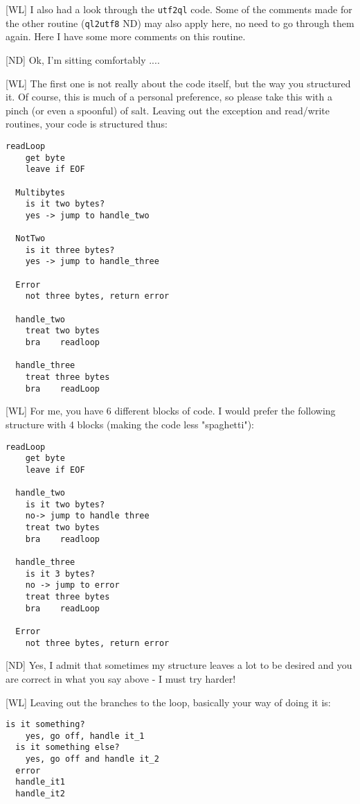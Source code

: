 [WL] I also had a look through the \texttt{utf2ql} code. Some of the comments made for the other routine (\texttt{ql2utf8} ND) may also apply here, no need to go through them again. Here I have some more comments on this routine.

[ND] Ok, I'm sitting comfortably ....
	
[WL] The first one is not really about the code itself, but the way you structured it. Of course, this is much of a personal preference, so please take this with a pinch (or even a spoonful) of salt. Leaving out the exception and read/write routines, your code is structured thus:
	
\begin{lstlisting}[numbers=none]
  readLoop
    get byte
    leave if EOF

  Multibytes
    is it two bytes?
    yes -> jump to handle_two
  
  NotTwo
    is it three bytes?
    yes -> jump to handle_three

  Error   
    not three bytes, return error

  handle_two   
    treat two bytes
    bra    readloop

  handle_three
    treat three bytes
    bra    readLoop
\end{lstlisting}
	
	
[WL] For me, you have 6 different blocks of code. I would prefer the following structure with 4 blocks (making the code less "spaghetti"):
	
\begin{lstlisting}[numbers=none]	
  readLoop
    get byte
    leave if EOF

  handle_two
    is it two bytes?
    no-> jump to handle three
    treat two bytes
    bra    readloop

  handle_three
    is it 3 bytes?
    no -> jump to error
    treat three bytes
    bra    readLoop

  Error   
    not three bytes, return error
\end{lstlisting}

[ND] Yes, I admit that sometimes my structure leaves a lot to be desired and you are correct in what you say above - I must try harder!
	
	
[WL] Leaving out the branches to the loop, basically your way of doing it is:
	
\begin{lstlisting}[numbers=none]	
  is it something?
    yes, go off, handle it_1
  is it something else?
    yes, go off and handle it_2
  error
  handle_it1
  handle_it2
\end{lstlisting}
	
